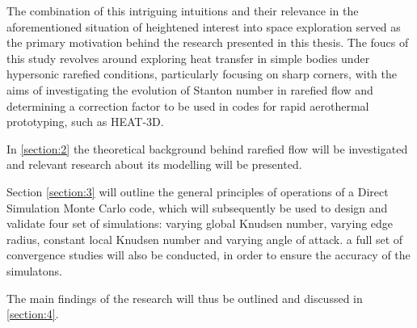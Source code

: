 The combination of this intriguing intuitions and their relevance in the aforementioned situation of heightened interest into space exploration served as the primary motivation behind the research presented in this thesis. The foucs of this study revolves around exploring heat transfer in simple bodies under hypersonic rarefied conditions, particularly focusing on sharp corners, with the aims of investigating the evolution of Stanton number in rarefied flow and determining a correction factor to be used in codes for rapid aerothermal prototyping, such as HEAT-3D.

In \autoref{section:2} the theoretical background behind rarefied flow will be investigated and relevant research about its modelling will be presented.

Section \ref{section:3} will outline the general principles of operations of a Direct Simulation Monte Carlo code, which will subsequently be used to design and validate four set of simulations: varying global Knudsen number, varying edge radius, constant local Knudsen number and varying angle of attack. a full set of convergence studies will also be conducted, in order to ensure the accuracy of the simulatons.

The main findings of the research will thus be outlined and discussed in \autoref{section:4}.

